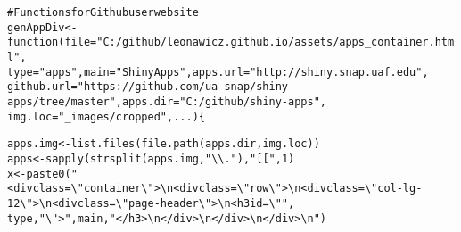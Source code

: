\documentclass{article}\usepackage[]{graphicx}\usepackage[]{color}
\makeatletter
\newcommand{\hlnum}[1]{\textcolor[rgb]{0.863,0.196,0.184}{#1}}%
\newcommand{\hlstr}[1]{\textcolor[rgb]{0.863,0.196,0.184}{#1}}%
\newcommand{\hlcom}[1]{\textcolor[rgb]{0.345,0.431,0.459}{#1}}%
\newcommand{\hlstd}[1]{\textcolor[rgb]{0.514,0.58,0.588}{#1}}%
\newcommand{\hlkwa}[1]{\textcolor[rgb]{0.796,0.294,0.086}{#1}}%
\newcommand{\hlkwb}[1]{\textcolor[rgb]{0.522,0.6,0}{#1}}%
\newcommand{\hlkwc}[1]{\textcolor[rgb]{0.796,0.294,0.086}{#1}}%
\newcommand{\hlkwd}[1]{\textcolor[rgb]{0.576,0.631,0.631}{#1}}%
\newenvironment{kframe}{%
 \def\at@end@of@kframe{}%
 \ifinner\ifhmode%
  \def\at@end@of@kframe{\end{minipage}}%
  \begin{minipage}{\columnwidth}%
 \fi\fi%
 \def\FrameCommand##1{\hskip\@totalleftmargin \hskip-\fboxsep
 \colorbox{shadecolor}{##1}\hskip-\fboxsep
     \hskip-\linewidth \hskip-\@totalleftmargin \hskip\columnwidth}%
 \MakeFramed {\advance\hsize-\width
   \@totalleftmargin\z@ \linewidth\hsize
   \@setminipage}}%
 {\par\unskip\endMakeFramed%
 \at@end@of@kframe}
\newenvironment{knitrout}{}{} %
\makeatother
\begin{document}
\begin{knitrout}
\color{fgcolor}\begin{kframe}
\begin{alltt}
\hlcom{# Functions for Github user website}
\hlstd{genAppDiv} \hlkwb{<-} \hlkwa{function}\hlstd{(}\hlkwc{file} \hlstd{=} \hlstr{"C:/github/leonawicz.github.io/assets/apps_container.html"}\hlstd{,}
    \hlkwc{type} \hlstd{=} \hlstr{"apps"}\hlstd{,} \hlkwc{main} \hlstd{=} \hlstr{"Shiny Apps"}\hlstd{,} \hlkwc{apps.url} \hlstd{=} \hlstr{"http://shiny.snap.uaf.edu"}\hlstd{,}
    \hlkwc{github.url} \hlstd{=} \hlstr{"https://github.com/ua-snap/shiny-apps/tree/master"}\hlstd{,} \hlkwc{apps.dir} \hlstd{=} \hlstr{"C:/github/shiny-apps"}\hlstd{,}
    \hlkwc{img.loc} \hlstd{=} \hlstr{"_images/cropped"}\hlstd{,} \hlkwc{...}\hlstd{) \{}

    \hlstd{apps.img} \hlkwb{<-} \hlkwd{list.files}\hlstd{(}\hlkwd{file.path}\hlstd{(apps.dir, img.loc))}
    \hlstd{apps} \hlkwb{<-} \hlkwd{sapply}\hlstd{(}\hlkwd{strsplit}\hlstd{(apps.img,} \hlstr{"\textbackslash{}\textbackslash{}."}\hlstd{),} \hlstr{"[["}\hlstd{,} \hlnum{1}\hlstd{)}
    \hlstd{x} \hlkwb{<-} \hlkwd{paste0}\hlstd{(}\hlstr{"<div class=\textbackslash{}"container\textbackslash{}">\textbackslash{}n  <div class=\textbackslash{}"row\textbackslash{}">\textbackslash{}n    <div class=\textbackslash{}"col-lg-12\textbackslash{}">\textbackslash{}n      <div class=\textbackslash{}"page-header\textbackslash{}">\textbackslash{}n        <h3 id=\textbackslash{}""}\hlstd{,}
        \hlstd{type,} \hlstr{"\textbackslash{}">"}\hlstd{, main,} \hlstr{"</h3>\textbackslash{}n      </div>\textbackslash{}n    </div>\textbackslash{}n  </div>\textbackslash{}n  "}\hlstd{)}


\end{alltt}
\end{kframe}
\end{knitrout}
\end{document}
